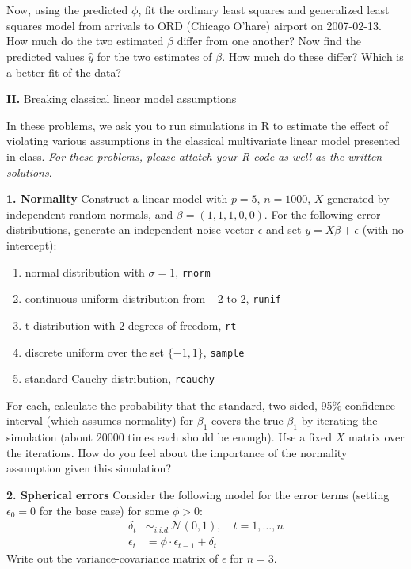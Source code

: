 \documentclass[12pt]{article}
\begin{document}
Now, using the predicted $\phi$, fit the ordinary least squares and generalized
least squares model from arrivals to ORD (Chicago O'hare) airport on 2007-02-13.
How much do the two estimated $\widehat{\beta}$ differ from one another? Now find the
predicted values $\widehat{y}$ for the two estimates of $\beta$. How much do
these differ? Which is a better fit of the data?

\newpage

{\bf II.} Breaking classical linear model assumptions

In these problems, we ask you to run simulations in R to estimate the effect of
violating various assumptions in the classical multivariate linear model presented
in class. {\it For these problems, please attatch your R code as well as the written
solutions}.

{\bf 1. Normality} Construct a linear model with $p=5$, $n=1000$,
$X$ generated by independent random normals, and $\beta = (1,1,1,0,0)$.
For the following error distributions, generate an independent noise
vector $\epsilon$ and set $y = X\beta + \epsilon$ (with no intercept):
\begin{enumerate}
\item normal distribution with $\sigma = 1$, \texttt{rnorm}
\item continuous uniform distribution from $-2$ to $2$, \texttt{runif}
\item t-distribution with $2$ degrees of freedom, \texttt{rt}
\item discrete uniform over the set $\{-1,1\}$, \texttt{sample}
\item standard Cauchy distribution, \texttt{rcauchy}
\end{enumerate}
For each, calculate the probability that the standard,
two-sided, 95\%-confidence interval (which assumes normality) for $\beta_1$
covers the true $\beta_1$ by iterating the simulation (about $20000$ times
each should be enough). Use a fixed $X$ matrix over the iterations.
How do you feel about the importance of the normality assumption given this simulation?

{\bf 2. Spherical errors} Consider the following model for the error terms
(setting $\epsilon_0 = 0$ for the base case) for some $\phi > 0$:
\begin{align}
\delta_t &\sim_{i.i.d.} \mathcal{N}(0,1), \quad t=1,\ldots,n \\
\epsilon_t &= \phi \cdot \epsilon_{t-1} + \delta_t
\end{align}
Write out the variance-covariance matrix of $\epsilon$ for $n=3$.
\end{document}

